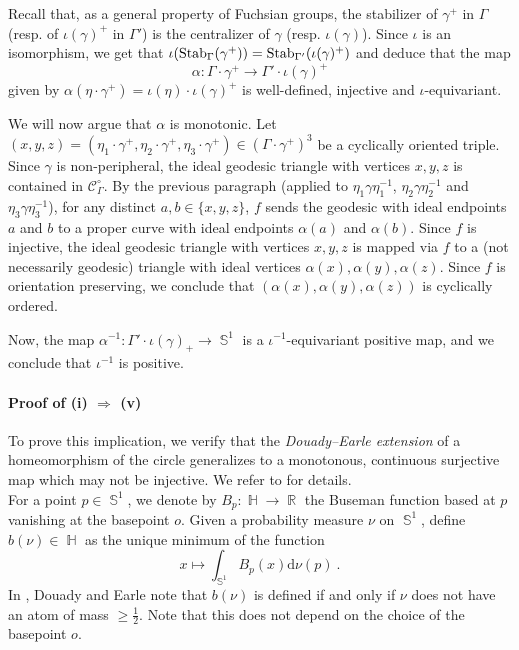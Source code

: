 \documentclass{amsart}
\theoremstyle{plain}
\theoremstyle{definition}
\DeclareMathOperator{\R}{\mathbb{R}}
\DeclareMathOperator{\Hb}{\mathbb{H}}
\DeclareMathOperator{\Sb}{\mathbb{S}}
\newcommand{\Stab}{\textnormal{Stab}}
\newcommand{\1}{\mathbf{1}}
\begin{document}
    Recall that, as a general property of Fuchsian groups, the stabilizer of $\gamma^+$ in $\Gamma$ (resp. of $\iota(\gamma)^+$ in $\Gamma'$) is the centralizer of $\gamma$ (resp. $\iota(\gamma)$). Since $\iota$ is an isomorphism, we get that $\iota(\Stab_\Gamma(\gamma^+))= \Stab_{\Gamma'}(\iota(\gamma)^+)$ and deduce that the map
    \[\alpha \colon \Gamma \cdot \gamma^+  \to \Gamma'\cdot \iota(\gamma)^+\]
    given by $\alpha(\eta\cdot \gamma^+) = \iota(\eta)\cdot \iota(\gamma)^+$
    is well-defined, injective and $\iota$-equivariant. 
    
    We will now argue that $\alpha$ is monotonic. Let $(x,y,z)= (\eta_1\cdot \gamma^+, \eta_2\cdot \gamma^+, \eta_3\cdot \gamma^+) \in (\Gamma \cdot \gamma^+)^3$ be a cyclically oriented triple. Since $\gamma$ is non-peripheral, the ideal geodesic triangle with vertices $x,y,z$ is contained in $\mathcal C_\Gamma^\circ$. By the previous paragraph (applied to $\eta_1\gamma \eta_1^{-1}$, $\eta_2\gamma \eta_2^{-1}$ and $\eta_3 \gamma \eta_3^{-1}$), for any distinct $a,b\in\{x,y,z\}$, $f$ sends the geodesic with ideal endpoints $a$ and $b$ to a proper curve with ideal endpoints $\alpha(a)$ and $\alpha(b)$. Since $f$ is injective, the ideal geodesic triangle with vertices $x,y,z$ is mapped via $f$ to a (not necessarily geodesic) triangle with ideal vertices $\alpha(x), \alpha(y), \alpha(z)$. Since $f$ is orientation preserving, we conclude that $(\alpha(x),\alpha(y),\alpha(z))$ is cyclically ordered.

    Now, the map $\alpha^{-1}: \Gamma'\cdot \iota(\gamma)_+ \to \Sb^1$ is a $\iota^{-1}$-equivariant positive map, and we conclude that $\iota^{-1}$ is positive.\\


\paragraph{Proof of (i) $\Rightarrow$ (v)}
To prove this implication, we verify that the \emph{Douady--Earle extension} of a homeomorphism of the circle generalizes to a  monotonous, continuous surjective map which may not be injective. We refer to \cite{DouadyEarle86} for details.\\

For a point $p \in \Sb^1$, we denote by $B_p:\Hb \to \R$ the Buseman function based at $p$ vanishing at the basepoint $o$. Given a probability measure $\nu$ on $\Sb^1$, define $b(\nu)\in \Hb$ as the unique minimum of the function
\[x\mapsto \int_{\Sb^1} B_p(x) \mathrm d \nu(p)~.\]
In \cite[Remark (2) p.26]{DouadyEarle86}, Douady and Earle note that $b(\nu)$ is defined if and only if $\nu$ does not have an atom of mass $\geq \frac{1}{2}$. Note that this does not depend on the choice of the basepoint $o$.
\end{document}
